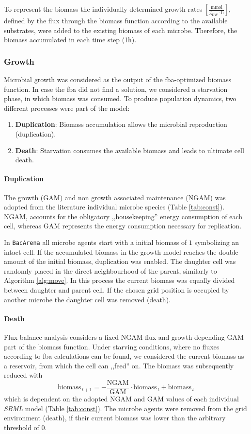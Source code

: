To represent the biomass the individually determined growth rates $[\frac{\mathrm{mmol}}{\mathrm{g_{DW} \cdot \mathrm{h}}}]$, defined by the flux through the biomass function according to the available substrates, were added to the existing biomass of each microbe. Therefore, the biomass accumulated in each time step (1\;h).

\subsubsection{Growth}
Microbial growth was considered as the output of the fba-optimized biomass function. In case the fba did not find a solution, we considered a starvation phase, in which biomass was consumed. 
To produce population dynamics, two different processes were part of the model:
\begin{enumerate}
	\item \textbf{Duplication}: Biomass accumulation allows the microbial reproduction (duplication).
	\item \textbf{Death}: Starvation consumes the available biomass and leads to ultimate cell death.
\end{enumerate}
\paragraph{Duplication}
The growth (GAM) and non growth associated maintenance (NGAM) was adopted from the literature individual microbe species (Table \hyperref[tab:const]{\ref{tab:const}}). NGAM, accounts for the obligatory ,,housekeeping'' energy consumption of each cell, whereas GAM represents the energy consumption necessary for replication. 

In \texttt{BacArena} all microbe agents start with a initial biomass of $1$ symbolizing an intact cell. If the accumulated biomass in the growth model reaches the double amount of the initial biomass, duplication was enabled. The daughter cell was randomly placed in the direct neighbourhood of the parent, similarly to Algorithm \hyperref[alg:move]{\ref{alg:move}}. In this process the current biomass was equally divided between daughter and parent cell. If the chosen grid position is occupied by another microbe the daughter cell was removed (death).
\paragraph{Death}
Flux balance analysis considers a fixed NGAM flux and growth depending GAM part of the biomass function.
Under starving conditions, where no fluxes according to fba calculations can be found, we considered the current biomass as a reservoir, from which the cell can ,,feed'' on. The biomass was subsequently reduced with
\[
  \textrm{biomass}_{\,t+1} = -\frac{\textrm{NGAM}}{\textrm{GAM}}\cdot \textrm{biomass}_{\,t}+\textrm{biomass}_{\,t}
\]
which is dependent on the adopted NGAM and GAM values of each individual \textit{SBML} model (Table \hyperref[tab:const]{\ref{tab:const}}). The microbe agents were removed from the grid environment (death), if their current biomass was lower than the arbitrary threshold of 0.